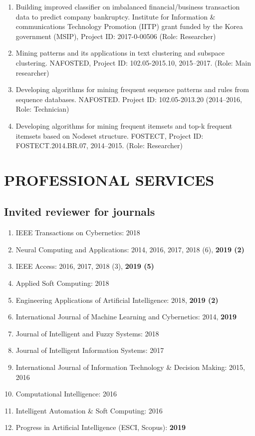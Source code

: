 \documentclass[letterpaper]{article}
\begin{document}
\begin{enumerate}

\item Building improved classifier on imbalanced financial/business transaction data to predict company bankruptcy. Institute for Information \& communications Technology Promotion (IITP) grant funded by the Korea government (MSIP), Project ID: 2017-0-00506 (Role: Researcher) 

\item Mining patterns and its applications in text clustering and subspace clustering. NAFOSTED, Project ID: 102.05-2015.10, 2015--2017. (Role: Main researcher) 

\item Developing algorithms for mining frequent sequence patterns and rules from sequence databases. NAFOSTED. Project ID: 102.05-2013.20 (2014--2016, Role: Technician)

\item Developing algorithms for mining frequent itemsets and top-k frequent itemsets based on Nodeset structure. FOSTECT, Project ID: FOSTECT.2014.BR.07, 2014--2015. (Role: Researcher) 

\end{enumerate}

\section*{PROFESSIONAL SERVICES}

\subsection*{Invited reviewer for journals}

\begin{enumerate}

\item IEEE Transactions on Cybernetics: 2018
\item Neural Computing and Applications: 2014, 2016, 2017, 2018 (6), \textbf{2019 (2)}
\item IEEE Access: 2016, 2017, 2018 (3), \textbf{2019 (5)}
\item Applied Soft Computing: 2018
\item Engineering Applications of Artificial Intelligence: 2018, \textbf{2019 (2)}
\item International Journal of Machine Learning and Cybernetics: 2014, \textbf{2019}
\item Journal of Intelligent and Fuzzy Systems: 2018
\item Journal of Intelligent Information Systems: 2017
\item International Journal of Information Technology \& Decision Making: 2015, 2016
\item Computational Intelligence: 2016
\item Intelligent Automation \& Soft Computing: 2016
\item Progress in Artificial Intelligence (ESCI, Scopus): \textbf{2019}

\end{enumerate}
\end{document}
